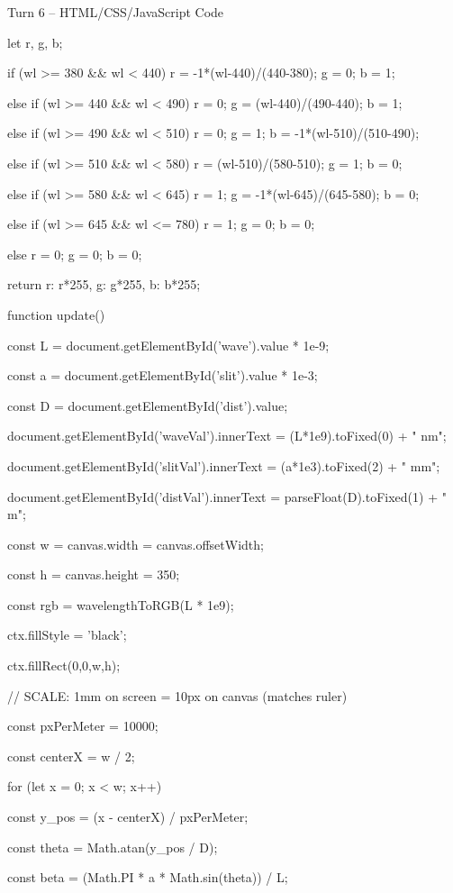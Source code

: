 \documentclass[10pt,a4paper]{article}
\begin{document}
\begin{htmlcodebox}{Turn 6 -- HTML/CSS/JavaScript Code}
{{{{    let r, g, b;

    if (wl >= 380 && wl < 440) { r = -1*(wl-440)/(440-380); g = 0; b = 1; }

    else if (wl >= 440 && wl < 490) { r = 0; g = (wl-440)/(490-440); b = 1; }

    else if (wl >= 490 && wl < 510) { r = 0; g = 1; b = -1*(wl-510)/(510-490); }

    else if (wl >= 510 && wl < 580) { r = (wl-510)/(580-510); g = 1; b = 0; }

    else if (wl >= 580 && wl < 645) { r = 1; g = -1*(wl-645)/(645-580); b = 0; }

    else if (wl >= 645 && wl <= 780) { r = 1; g = 0; b = 0; }

    else { r = 0; g = 0; b = 0; }

    return {r: r*255, g: g*255, b: b*255};

}

function update() {

    const L = document.getElementById('wave').value * 1e-9;

    const a = document.getElementById('slit').value * 1e-3;

    const D = document.getElementById('dist').value;


    document.getElementById('waveVal').innerText = (L*1e9).toFixed(0) + " nm";

    document.getElementById('slitVal').innerText = (a*1e3).toFixed(2) + " mm";

    document.getElementById('distVal').innerText = parseFloat(D).toFixed(1) + " m";

    const w = canvas.width = canvas.offsetWidth;

    const h = canvas.height = 350;

    const rgb = wavelengthToRGB(L * 1e9);

    ctx.fillStyle = 'black';

    ctx.fillRect(0,0,w,h);

    // SCALE: 1mm on screen = 10px on canvas (matches ruler)

    const pxPerMeter = 10000;

    const centerX = w / 2;

    for (let x = 0; x < w; x++) {

        const y_pos = (x - centerX) / pxPerMeter;

        const theta = Math.atan(y_pos / D);

        const beta = (Math.PI * a * Math.sin(theta)) / L;

}}}}}
\end{htmlcodebox}
\end{document}
